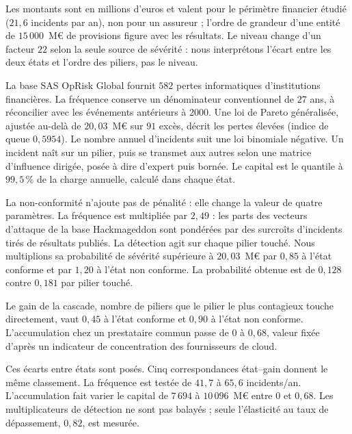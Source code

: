 Les montants sont en millions d'euros et valent pour le périmètre financier étudié ($21{,}6$ incidents par an), non pour un assureur ; l'ordre de grandeur d'une entité de $15\,000$~M\euro{} de provisions figure avec les résultats.
Le niveau change d'un facteur $22$ selon la seule source de sévérité : nous interprétons l'écart
entre les deux états et l'ordre des piliers, pas le niveau.

La base SAS OpRisk Global fournit $582$ pertes informatiques d'institutions financières. La fréquence conserve un dénominateur conventionnel de $27$ ans, à réconcilier avec les événements antérieurs à 2000. Une loi de Pareto généralisée, ajustée au-delà de $20{,}03$~M\euro{} sur $91$ excès, décrit les
pertes élevées (indice de queue $0{,}5954$). Le nombre annuel d'incidents suit une loi binomiale négative. Un incident naît sur
un pilier, puis se transmet aux autres selon une matrice d'influence dirigée, posée à dire d'expert
puis bornée.  Le
capital est le quantile à $99{,}5\,\%$ de la charge annuelle, calculé dans chaque état.

La non-conformité n'ajoute pas de pénalité : elle change la valeur de quatre paramètres. La fréquence est multipliée par $2{,}49$ : les parts des vecteurs d'attaque de la base
Hackmageddon sont pondérées par des surcroîts d'incidents tirés de résultats publiés.
La détection agit sur chaque pilier touché. Nous multiplions sa probabilité de sévérité supérieure à
$20{,}03$~M\euro{} par $0{,}85$ à l'état conforme et par $1{,}20$ à l'état non conforme.
La probabilité obtenue est de $0{,}128$ contre $0{,}181$ par pilier touché.

Le gain de la cascade, nombre de piliers
que le pilier le plus contagieux touche directement, vaut $0{,}45$ à l'état conforme et $0{,}90$ à
l'état non conforme. L'accumulation chez un prestataire commun passe de $0$ à
$0{,}68$, valeur fixée d'après un indicateur de concentration des fournisseurs de cloud.

Ces écarts entre états sont posés. Cinq correspondances état--gain donnent le même classement. La fréquence est testée de $41{,}7$ à $65{,}6$ incidents/an. L'accumulation fait varier le capital de $7\,694$ à $10\,096$~M\euro{} entre $0$ et $0{,}68$. Les multiplicateurs de détection ne sont pas balayés ; seule l'élasticité au taux de dépassement, $0{,}82$, est mesurée.

